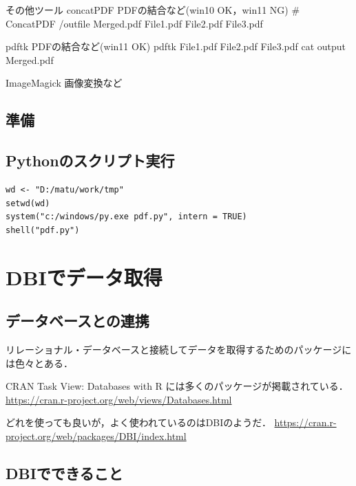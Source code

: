 \documentclass[
]{article}
\begin{document}
その他ツール
concatPDF
PDFの結合など(win10 OK，win11 NG)
\# ConcatPDF /outfile Merged.pdf File1.pdf File2.pdf File3.pdf

pdftk
PDFの結合など(win11 OK)
pdftk File1.pdf File2.pdf File3.pdf cat output Merged.pdf

ImageMagick
画像変換など

\hypertarget{ux6e96ux5099-4}{%
\subsection{準備}\label{ux6e96ux5099-4}}

\hypertarget{pythonux306eux30b9ux30afux30eaux30d7ux30c8ux5b9fux884c}{%
\subsection{Pythonのスクリプト実行}\label{pythonux306eux30b9ux30afux30eaux30d7ux30c8ux5b9fux884c}}

\begin{verbatim}
wd <- "D:/matu/work/tmp"
setwd(wd)
system("c:/windows/py.exe pdf.py", intern = TRUE)
shell("pdf.py")
\end{verbatim}

\hypertarget{dbi}{%
\section{DBIでデータ取得}\label{dbi}}

\hypertarget{ux30c7ux30fcux30bfux30d9ux30fcux30b9ux3068ux306eux9023ux643a}{%
\subsection{データベースとの連携}\label{ux30c7ux30fcux30bfux30d9ux30fcux30b9ux3068ux306eux9023ux643a}}

リレーショナル・データベースと接続してデータを取得するためのパッケージには色々とある．

CRAN Task View: Databases with R には多くのパッケージが掲載されている．
\url{https://cran.r-project.org/web/views/Databases.html}

どれを使っても良いが，よく使われているのはDBIのようだ．
\url{https://cran.r-project.org/web/packages/DBI/index.html}

\hypertarget{dbiux3067ux3067ux304dux308bux3053ux3068}{%
\subsection{DBIでできること}\label{dbiux3067ux3067ux304dux308bux3053ux3068}}
\end{document}
